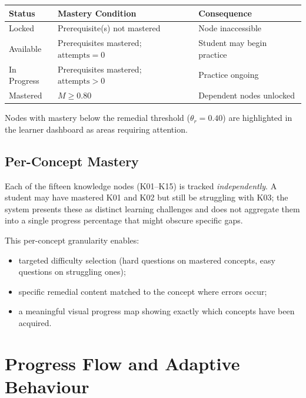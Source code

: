 \documentclass[12pt,a4paper]{article}
\begin{document}
\begin{center}
\begin{tabular}{lll}
  \toprule
  \textbf{Status} & \textbf{Mastery Condition} & \textbf{Consequence} \\
  \midrule
  Locked      & Prerequisite(s) not mastered  & Node inaccessible \\
  Available   & Prerequisites mastered; $\text{attempts} = 0$
              & Student may begin practice \\
  In Progress & Prerequisites mastered; $\text{attempts} > 0$
              & Practice ongoing \\
  Mastered    & $M \geq 0.80$                 & Dependent nodes unlocked \\
  \bottomrule
\end{tabular}
\end{center}

Nodes with mastery below the remedial threshold ($\theta_r = 0.40$) are
highlighted in the learner dashboard as areas requiring attention.

\subsection{Per-Concept Mastery}

Each of the fifteen knowledge nodes (K01–K15) is tracked \emph{independently}.
A student may have mastered K01 and K02 but still be struggling with K03;
the system presents these as distinct learning challenges and does not
aggregate them into a single progress percentage that might obscure specific
gaps.

This per-concept granularity enables:
\begin{itemize}[leftmargin=1.8em]
  \item targeted difficulty selection (hard questions on mastered concepts,
        easy questions on struggling ones);
  \item specific remedial content matched to the concept where errors occur;
  \item a meaningful visual progress map showing exactly which concepts have
        been acquired.
\end{itemize}

\section{Progress Flow and Adaptive Behaviour\label{sec:progress}}
\end{document}

